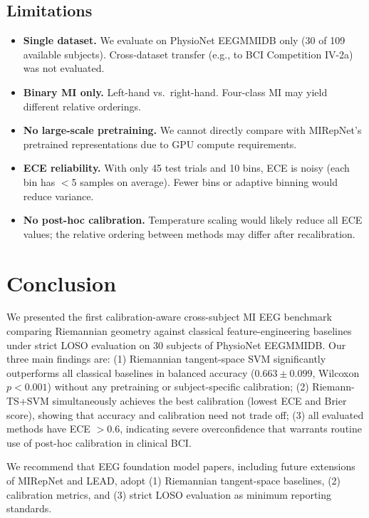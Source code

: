 \documentclass[conference]{IEEEtran}
\begin{document}
\subsection{Limitations}
\begin{itemize}
\item \textbf{Single dataset.} We evaluate on PhysioNet EEGMMIDB only (30 of
  109 available subjects). Cross-dataset transfer (e.g., to BCI Competition IV-2a)
  was not evaluated.
\item \textbf{Binary MI only.} Left-hand vs.\ right-hand. Four-class MI may
  yield different relative orderings.
\item \textbf{No large-scale pretraining.} We cannot directly compare with
  MIRepNet's pretrained representations due to GPU compute requirements.
\item \textbf{ECE reliability.} With only 45 test trials and 10 bins, ECE is
  noisy (each bin has $<$5 samples on average). Fewer bins or adaptive binning
  would reduce variance.
\item \textbf{No post-hoc calibration.} Temperature scaling would likely reduce
  all ECE values; the relative ordering between methods may differ after
  recalibration.
\end{itemize}

\section{Conclusion}
\label{sec:conclusion}

We presented the first calibration-aware cross-subject MI EEG benchmark
comparing Riemannian geometry against classical feature-engineering baselines
under strict LOSO evaluation on 30 subjects of PhysioNet EEGMMIDB. Our
three main findings are:
(1) Riemannian tangent-space SVM significantly outperforms all classical
baselines in balanced accuracy ($0.663 \pm 0.099$, Wilcoxon $p < 0.001$)
without any pretraining or subject-specific calibration;
(2) Riemann-TS+SVM simultaneously achieves the best calibration (lowest ECE
and Brier score), showing that accuracy and calibration need not trade off;
(3) all evaluated methods have ECE $> 0.6$, indicating severe overconfidence
that warrants routine use of post-hoc calibration in clinical BCI.

We recommend that EEG foundation model papers, including future extensions of
MIRepNet and LEAD, adopt (1) Riemannian tangent-space baselines, (2) calibration
metrics, and (3) strict LOSO evaluation as minimum reporting standards.
\end{document}
